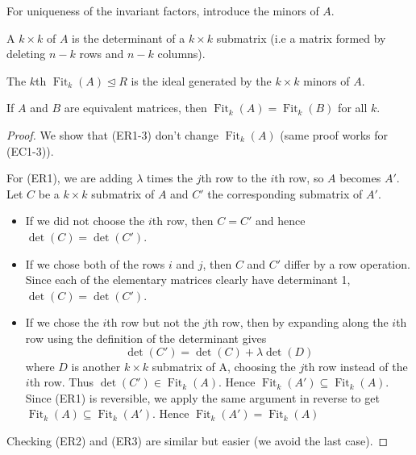 \documentclass[egregdoesnotlikesansseriftitles,a4paper]{scrartcl}
\begin{document}
For uniqueness of the invariant factors, introduce the minors of $A$.
\begin{definition*}
        A $k \times k$  of $A$ is the determinant of a $k \times k$ submatrix (i.e a matrix formed by deleting $n-k$ rows and $n-k$ columns).
\end{definition*}
\begin{definition*}
        The $k$th  $\operatorname{Fit}_{k}(A) \unlhd R$ is the ideal generated by the $k \times k$ minors of $A$.
\end{definition*}
\begin{lemma}
        If $A$ and $B$ are equivalent matrices, then $\operatorname{Fit}_{k}(A)=\operatorname{Fit}_{k}(B)$ for all $k$.
\end{lemma}
\begin{proof}
       We show that (ER1-3) don't change $\operatorname{Fit}_{k}(A)$ (same proof works for (EC1-3)).

       For (ER1), we are adding $\lambda$ times the $j$th row to the $i$th row, so $A$ becomes $A'$. Let $C$ be a $k \times k$ submatrix of $A$ and $C'$ the corresponding submatrix of $A'$.
       \begin{itemize}
              \item If we did not choose the $i$th row, then $C=C'$ and hence $\operatorname{det}(C) =\operatorname{det}(C') $.
              \item If we chose both of the rows $i$ and $j$, then $C$ and $C'$ differ by a row operation. Since each of the elementary matrices clearly have determinant 1, $ \operatorname{det}(C) =\operatorname{det}(C') $.
              \item If we chose the $i$th row but not the $j$th row, then by expanding along the $i$th row using the definition of the determinant gives \[
                   \operatorname{det}(C') =\operatorname{det}(C) + \lambda \operatorname{det}(D) 
              \]  where $D$ is another $k \times k$ submatrix of A, choosing the $j$th row instead of the $i$th row. Thus $\operatorname{det}(C') \in \operatorname{Fit}_{k}(A)$. Hence $\operatorname{Fit}_{k}(A') \subseteq \operatorname{Fit}_{k}(A)$. Since (ER1) is reversible, we apply the same argument in reverse to get $\operatorname{Fit}_{k}(A) \subseteq \operatorname{Fit}_{k}(A')$. Hence $\operatorname{Fit}_{k}(A') = \operatorname{Fit}_{k}(A)$
       \end{itemize}
       Checking (ER2) and (ER3) are similar but easier (we avoid the last case).
\end{proof}
\end{document}
